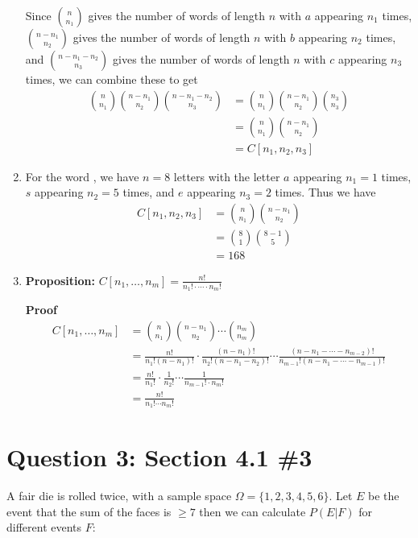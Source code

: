 \documentclass[11pt, oneside]{article}   	%
\begin{document}
\begin{enumerate}[\quad (a)]
	Since ${n \choose n_1}$ gives the number of words of length $n$ with $a$ appearing $n_1$ times, ${n-n_1 \choose n_2}$ gives the number of words of length $n$ with $b$ appearing $n_2$ times, and ${n-n_1-n_2 \choose n_3}$ gives the number of words of length $n$ with $c$ appearing $n_3$ times, we can combine these to get
	\begin{align*}
		{n \choose n_1} {n-n_1 \choose n_2} {n-n_1-n_2 \choose n_3} & = {n \choose n_1} {n-n_1 \choose n_2} {n_3 \choose n_3}  \\
		& = {n \choose n_1} {n-n_1 \choose n_2} \\
		& = C[n_1, n_2, n_3]
	\end{align*}
	
	\item For the word , we have $n=8$ letters with the letter $a$ appearing $n_1=1$ times, $s$ appearing $n_2=5$ times, and $e$ appearing $n_3=2$ times. Thus we have
	\begin{align*}
		C[n_1, n_2, n_3] & = {n \choose n_1} {n-n_1 \choose n_2} \\
		& = {8 \choose 1} {8-1 \choose5} \\
		& = 168
	\end{align*}
	
	\item \textbf{Proposition:} $C[n_1, \ldots , n_m] = \frac{n!}{n_1! \cdot \cdots \cdot n_m!}$
	
	\textbf{Proof}
	\begin{align*}
		C[n_1, \ldots , n_m] & = {n \choose n_1} {n-n_1 \choose n_2} \cdots {n_m \choose n_m} \\
		& = \frac{n!}{n_1! (n-n_1)!} \cdot \frac{(n-n_1)!}{n_2! (n-n_1-n_2)!} \cdots \frac{(n-n_1- \cdots - n_{m-2})!}{n_{m-1}! (n-n_1- \cdots - n_{m-1})!}  \\
		& = \frac{n!}{n_1!} \cdot \frac{1}{n_2!} \cdots \frac{1}{n_{m-1}! \cdot n_m!} \\
		& = \frac{n!}{n_1! \cdots n_m!}
	\end{align*}
\end{enumerate}

\section*{Question 3: Section 4.1 \#3}
A fair die is rolled twice, with a sample space $\Omega = \{1,2,3,4,5,6\}$. Let $E$ be the event that the sum of the faces is $\geq 7$ then we can calculate $P(E | F)$ for different events $F$:
\end{document}
